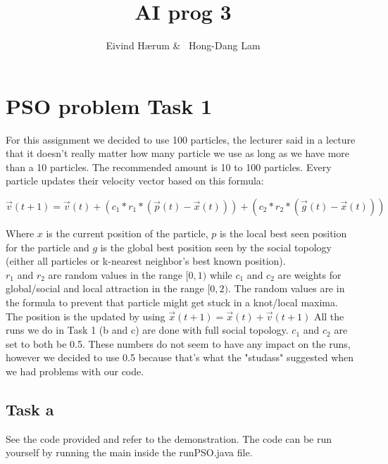 \documentclass[12pt, a4paper]{article}
\title{AI prog 3}
\author{Eivind Hærum \& \ Hong-Dang Lam}
\begin{document}
\maketitle
% 
% 
 
\newpage
\tableofcontents
\newpage
 
\section{PSO problem Task 1}
For this assignment we decided to use 100 particles, the lecturer said in a lecture that it doesn't really matter how many particle we use as long as we have more than a 10 particles. The recommended amount is 10 to 100 particles.
Every particle updates their velocity vector based on this formula:
\begin{center}
$\vec{v}(t+1)=\vec{v}(t)+(c_1*r_1*(\vec{p}(t)-\vec{x}(t))) +(c_2*r_2*(\vec{g}(t)-\vec{x}(t)))$
\end{center}
Where $x$ is the current position of the particle, $p$ is the local best seen position for the particle and $g$ is the global best position seen by the social topology (either all particles or k-nearest neighbor's best known position).\\
$r_1$ and $r_2$ are random values in the range $[0,1)$ while $c_1$ and $c_2$ are weights for global/social and local attraction in the range $[0,2)$. The random values are in the formula to prevent that particle might get stuck in a knot/local maxima.\\
The position is the updated by using $\vec{x}(t+1)=\vec{x}(t)+\vec{v}(t+1)$
All the runs we do in Task 1 (b and c) are done with full social topology.
$c_1$ and $c_2$ are set to both be 0.5. These numbers do not seem to have any impact on the runs, however we decided to use 0.5 because that's what the "studass" suggested when we had problems with our code.

\subsection{Task a}
See the code provided and refer to the demonstration.
The code can be run yourself by running the main inside the runPSO.java file.
\end{document}
